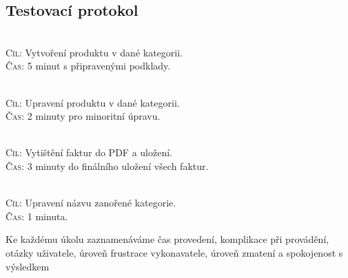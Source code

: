 \documentclass[11pt,a4paper]{article}
\begin{document}
\subsection*{Testovací protokol}
\\
\textsc{Cíl}: Vytvoření produktu v dané kategorii.\\
\textsc{Čas}: 5 minut s připravenými podklady.\\
\bigskip

\\
\textsc{Cíl}: Upravení produktu v dané kategorii.\\
\textsc{Čas}: 2 minuty pro minoritní úpravu.\\
\bigskip

\\
\textsc{Cíl}: Vytištění faktur do PDF a uložení.\\
\textsc{Čas}: 3 minuty do finálního uložení všech faktur.\\
\bigskip

\\
\textsc{Cíl}: Upravení názvu zanořené kategorie.\\
\textsc{Čas}: 1 minuta.\\
\bigskip

\noindent Ke každému úkolu zaznamenáváme čas provedení, komplikace při provádění, otázky uživatele, úroveň frustrace vykonavatele, úroveň zmatení a spokojenost s výsledkem
\end{document}
